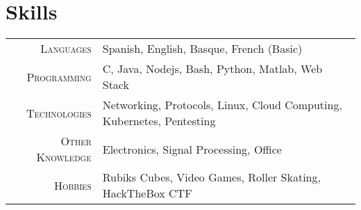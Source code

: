 \documentclass[a4paper,10pt]{article}
\begin{document}
\begin{tabular}{rp{13.6cm}}
\end{tabular}

 \vspace{-.3in}

\section{Skills}
\begin{tabular}{r|l}
\textsc{Languages} & Spanish, English, Basque, French (Basic) \\
\textsc{Programming} & C, Java, Nodejs, Bash, Python, Matlab, Web Stack \\
\textsc{Technologies} & Networking, Protocols, Linux, Cloud Computing, Kubernetes, Pentesting  \\
\textsc{Other Knowledge} & Electronics, Signal Processing, Office \\
\textsc{Hobbies} & Rubiks Cubes, Video Games, Roller Skating, HackTheBox CTF
\end{tabular}
\end{document}
